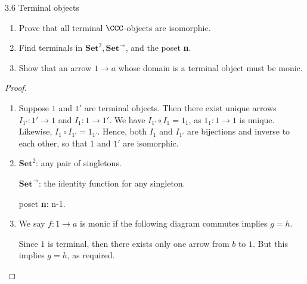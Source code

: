 \begin{exercise}{3.6 Terminal objects}
\begin{enumerate}
    \item Prove that all terminal $\CCC$-objects are isomorphic.
    \item Find terminals in $\mathbf{Set}^2, \mathbf{Set}^\rightarrow$, and the poset \textbf{n}.
    \item Show that an arrow $1\rightarrow a$ whose domain is a terminal object must be monic.
\end{enumerate}
\end{exercise}
\begin{proof}
 \begin{enumerate}
     \item Suppose $1$ and $1'$ are terminal objects. Then there exist unique arrows $I_{1'}:1'\rightarrow 1$ and $I_{1}:1\rightarrow 1'$. We have $I_{1'}\circ I_{1}=1_{1}$, as $1_{1}:1\rightarrow 1$ is unique. Likewise, $I_{1}\circ I_{1'}=1_{1'}$. Hence, both $I_{1}$ and $I_{1'}$ are bijections and inverse to each other, so that $1$ and $1'$ are isomorphic.
     \item $\mathbf{Set}^{2}$: any pair of singletons.

     $\mathbf{Set}^{\rightarrow}$: the identity function for any singleton.

     poset \textbf{n}: n-1.
     \item We say $f:1\rightarrow a$ is monic if the following diagram commutes implies $g=h$.
     

    Since $1$ is terminal, then there exists only one arrow from $b$ to $1$. But this implies $g=h$, as required.
 \end{enumerate}
\end{proof}

